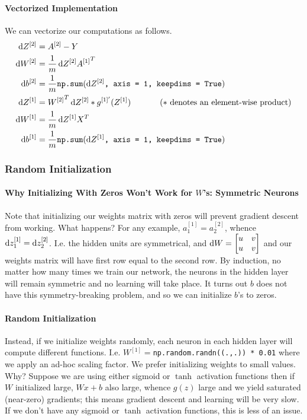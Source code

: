 \documentclass[12pt]{article}
\begin{document}
\paragraph{Vectorized Implementation}
We can vectorize our computations as follows.
\begin{align*}   \d Z^{[2]} &= A^{[2]} - Y \\
  \d W^{[2]} &= \frac{1}{m} \d Z^{[2]} {A^{[1]}}^T \\
  \d b^{[2]} &= \frac{1}{m} \texttt{np.sum}(\d Z^{[2]}\texttt{, axis = 1, keepdims = True}) \\
  \d Z^{[1]} &= {W^{[2]}}^T \d Z^{[2]} * g^{[1]'}(Z^{[1]}) \hspace{35pt} (* \textrm{ denotes an element-wise product})\\
  \d W^{[1]} &= \frac{1}{m} \d Z^{[1]} X^T \\ 
  \d b^{[1]} &= \frac{1}{m} \texttt{np.sum}(\d Z^{[1]}\texttt{, axis = 1, keepdims = True}) \end{align*}

\subsubsection{Random Initialization}
\paragraph{Why Initializing With Zeros Won't Work for $W$'s: Symmetric Neurons}
Note that initializing our weights matrix with zeros will prevent gradient descent from working. What happens? For any example, $a_1^{[1]} = a_2^{[2]}$, whence $\operatorname{d}\!{z}_1^{[1]} = \operatorname{d}\!{z}_2^{[2]}$. I.e. the hidden units are symmetrical, and $\operatorname{d}\!{W} = \begin{bmatrix}   u & v \\ u & v \end{bmatrix}$ and our weights matrix will have first row equal to the second row. By induction, no matter how many times we train our network, the neurons in the hidden layer will remain symmetric and no learning will take place. 
It turns out $b$ does not have this symmetry-breaking problem, and so we can initialize $b$'s to zeros.

\paragraph{Random Initialization}
Instead, if we initialize weights randomly, each neuron in each hidden layer will compute different functions. I.e. $W^{[1]} = $\texttt{np.random.randn((.,.)) * 0.01} where we apply an ad-hoc scaling factor. We prefer initializing weights to small values. Why? Suppose we are using either sigmoid or $\tanh$ activation functions then if $W$ initialized large, $Wx + b$ also large, whence $g(z)$ large and we yield saturated (near-zero) gradients; this means gradient descent and learning will be very slow. If we don't have any sigmoid or $\tanh$ activation functions, this is less of an issue. 
\end{document}
